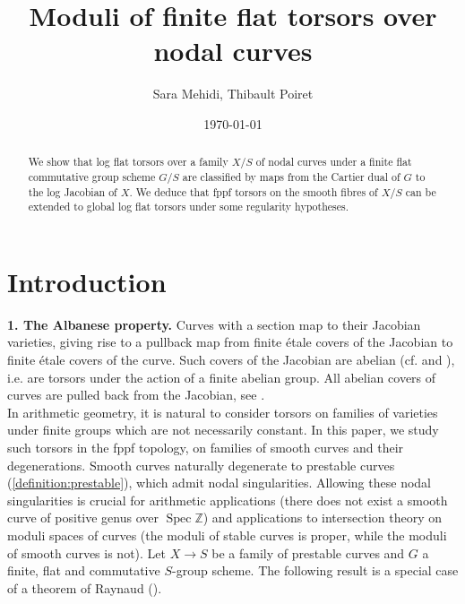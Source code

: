\documentclass[a4paper,11pt]{amsart} %
\title[Moduli of finite flat torsors over nodal curves]{Moduli of finite flat torsors over nodal curves}
\author[S. Mehidi, T. Poiret]{Sara Mehidi, Thibault Poiret}
\date{\today}
\numberwithin{equation}{subsection}
\newcommand{\on}[1]{\operatorname{#1}}
\theoremstyle{definition}
\theoremstyle{plain}%
\theoremstyle{remark}
\begin{document}
\begin{abstract}
We show that log flat torsors over a family $X/S$ of nodal curves under a finite flat commutative group scheme $G/S$ are classified by maps from the Cartier dual of $G$ to the log Jacobian of $X$. We deduce that fppf torsors on the smooth fibres of $X/S$ can be extended to global log flat torsors under some regularity hypotheses.
\end{abstract}

\maketitle
	


\tableofcontents



\section{Introduction}





\noindent\textbf{1. The Albanese property.}
Curves with a section map to their Jacobian varieties, giving rise to a pullback map from finite \'etale covers of the Jacobian to finite \'etale covers of the curve. Such covers of the Jacobian are abelian (cf. \cite[Remark 15.3]{Milne1986Ab} and \cite[\S 18 p 167]{Mumford}), i.e. are torsors under the action of a finite abelian group. All abelian covers of curves are pulled back from the Jacobian, see \cite[\S 9]{Milne1986}.\\

In arithmetic geometry, it is natural to consider torsors on families of varieties under finite groups which are not necessarily constant. In this paper, we study such torsors in the fppf topology, on families of smooth curves and their degenerations. Smooth curves naturally degenerate to prestable curves (\ref{definition:prestable}), which admit nodal singularities. Allowing these nodal singularities is crucial for arithmetic applications (there does not exist a smooth curve of positive genus over $\on{Spec}\mathbb Z$) and applications to intersection theory on moduli spaces of curves (the moduli of stable curves is proper, while the moduli of smooth curves is not). Let $X \to S$ be a family of prestable curves and $G$ a finite, flat and commutative $S$-group scheme. The following result is a special case of a theorem of Raynaud (\cite[Proposition 6.2.1]{Raynaud1970Specialisation-}).
\end{document}

